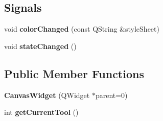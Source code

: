 \subsection*{Signals}
\begin{DoxyCompactItemize}
\item 
\hypertarget{classCanvasWidget_a40301a55d3c5c4af8fdbb9a70942055c}{void {\bfseries color\-Changed} (const Q\-String \&style\-Sheet)}\label{classCanvasWidget_a40301a55d3c5c4af8fdbb9a70942055c}

\item 
\hypertarget{classCanvasWidget_ac2e5cfa7aac9658bf358af1e9b15d99e}{void {\bfseries state\-Changed} ()}\label{classCanvasWidget_ac2e5cfa7aac9658bf358af1e9b15d99e}

\end{DoxyCompactItemize}
\subsection*{Public Member Functions}
\begin{DoxyCompactItemize}
\item 
\hypertarget{classCanvasWidget_a3056d84c95e47f825ab4be09f48c0662}{{\bfseries Canvas\-Widget} (Q\-Widget $\ast$parent=0)}\label{classCanvasWidget_a3056d84c95e47f825ab4be09f48c0662}

\item 
\hypertarget{classCanvasWidget_a990d94414822524b183a4d90330ab13b}{int {\bfseries get\-Current\-Tool} ()}\label{classCanvasWidget_a990d94414822524b183a4d90330ab13b}

\end{DoxyCompactItemize}
